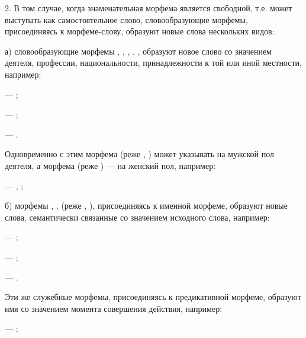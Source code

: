 2. В том случае, когда знаменательная морфема является свободной, т.е. может выступать как самостоятельное слово, словообразующие морфемы, присоединяясь к морфеме-слову, образуют новые слова нескольких видов:

а) словообразующие морфемы , , , , ,  образуют новое слово со значением деятеля, профессии, национальности, принадлежности к той или иной местности, например:
\begin{prfsample}
    \item {} --- ;
    \item {} --- ;
    \item {} --- .    
\end{prfsample}

Одновременно с этим морфема  (реже , ) может указывать на мужской пол деятеля, а морфема  (реже ) --- на женский пол, например:
\begin{prfsample}
    \item {} --- , ;
\end{prfsample}


б) морфемы , ,  (реже , ), присоединяясь к именной морфеме, образуют новые слова, семантически связанные со значением исходного слова, например:
\begin{prfsample}
    \item {} --- ;
    \item {} --- ;
    \item {} --- .
\end{prfsample}
Эти же служебные морфемы, присоединяясь к предикативной морфеме, образуют имя со значением момента совершения действия, например:
\begin{prfsample}
    \item {} --- ;
\end{prfsample}

